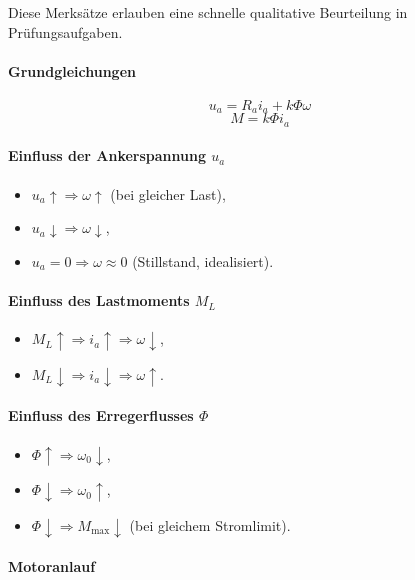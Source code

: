Diese Merksätze erlauben eine schnelle qualitative Beurteilung in Prüfungsaufgaben.

\paragraph{Grundgleichungen}

\[
\boxed{u_a = R_a i_a + k\Phi \omega}
\]
\[
\boxed{M = k\Phi i_a}
\]

\paragraph{Einfluss der Ankerspannung $u_a$}

\begin{itemize}
\item $u_a \uparrow \Rightarrow \omega \uparrow$ (bei gleicher Last),
\item $u_a \downarrow \Rightarrow \omega \downarrow$,
\item $u_a = 0 \Rightarrow \omega \approx 0$ (Stillstand, idealisiert).
\end{itemize}

\paragraph{Einfluss des Lastmoments $M_L$}

\begin{itemize}
\item $M_L \uparrow \Rightarrow i_a \uparrow \Rightarrow \omega \downarrow$,
\item $M_L \downarrow \Rightarrow i_a \downarrow \Rightarrow \omega \uparrow$.
\end{itemize}

\paragraph{Einfluss des Erregerflusses $\Phi$}

\begin{itemize}
\item $\Phi \uparrow \Rightarrow \omega_0 \downarrow$,
\item $\Phi \downarrow \Rightarrow \omega_0 \uparrow$,
\item $\Phi \downarrow \Rightarrow M_{\max} \downarrow$ (bei gleichem Stromlimit).
\end{itemize}

\paragraph{Motoranlauf}

